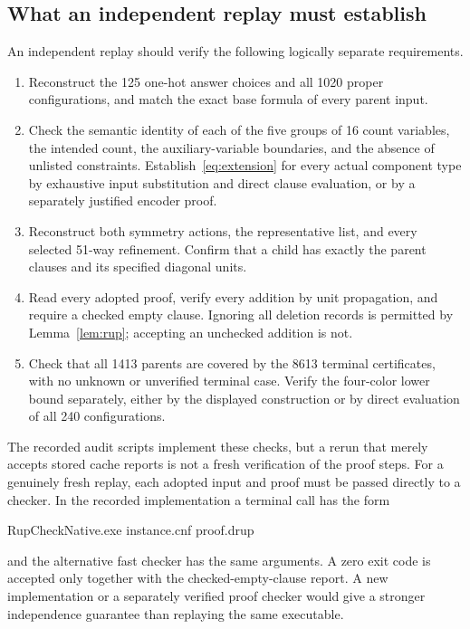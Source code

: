\subsection{What an independent replay must establish}
An independent replay should verify the following logically separate
requirements.
\begin{enumerate}
\item Reconstruct the 125 one-hot answer choices and all 1020 proper
configurations, and match the exact base formula of every parent input.
\item Check the semantic identity of each of the five groups of 16 count
variables, the intended count, the auxiliary-variable boundaries, and the
absence of unlisted constraints. Establish~\eqref{eq:extension} for every
actual component type by exhaustive input substitution and direct clause
evaluation, or by a separately justified encoder proof.
\item Reconstruct both symmetry actions, the representative list, and
every selected 51-way refinement. Confirm that a child has exactly the
parent clauses and its specified diagonal units.
\item Read every adopted proof, verify every addition by unit propagation,
and require a checked empty clause. Ignoring all deletion records is
permitted by Lemma~\ref{lem:rup}; accepting an unchecked addition is not.
\item Check that all 1413 parents are covered by the 8613 terminal
certificates, with no unknown or unverified terminal case. Verify the
four-color lower bound separately, either by the displayed construction
or by direct evaluation of all 240 configurations.
\end{enumerate}

The recorded audit scripts implement these checks, but a rerun that merely
accepts stored cache reports is not a fresh verification of the proof
steps. For a genuinely fresh replay, each adopted input and proof must be
passed directly to a checker. In the recorded implementation a terminal
call has the form
\begin{center}\small\ttfamily
RupCheckNative.exe instance.cnf proof.drup
\end{center}
and the alternative fast checker has the same arguments. A zero exit code
is accepted only together with the checked-empty-clause report. A new
implementation or a separately verified proof checker would give a
stronger independence guarantee than replaying the same executable.

